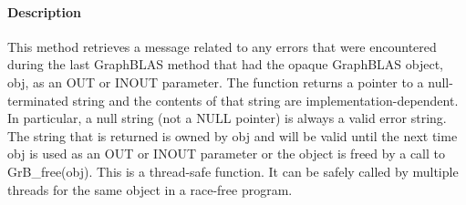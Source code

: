 \paragraph{Description}

This method retrieves a message related to any errors that were encountered 
during the last GraphBLAS method that had the opaque GraphBLAS object, 
{\sf obj}, as an {\sf OUT} or {\sf INOUT} parameter.   The function returns a 
pointer to a null-terminated string and the contents of that string are 
implementation-dependent.  In particular, a null 
string (not a {\sf NULL} pointer) is always a valid error string.  The string 
that is returned is owned by {\sf obj} and will be valid until the next time 
{\sf obj} is used as an {\sf OUT} or {\sf INOUT} parameter or the object is freed
by a call to {\sf GrB\_free(obj)}.  This is a thread-safe function.  It can be 
safely called by multiple threads for the same object in a race-free program.
